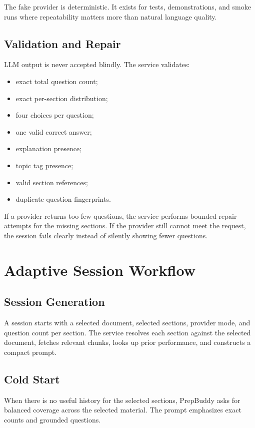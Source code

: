 \documentclass[11pt]{article}
\begin{document}
The fake provider is deterministic. It exists for tests, demonstrations, and smoke runs where repeatability matters more than natural language quality.

\subsection{Validation and Repair}

LLM output is never accepted blindly. The service validates:

\begin{itemize}
  \item exact total question count;
  \item exact per-section distribution;
  \item four choices per question;
  \item one valid correct answer;
  \item explanation presence;
  \item topic tag presence;
  \item valid section references;
  \item duplicate question fingerprints.
\end{itemize}

If a provider returns too few questions, the service performs bounded repair attempts for the missing sections. If the provider still cannot meet the request, the session fails clearly instead of silently showing fewer questions.

\section{Adaptive Session Workflow}

\subsection{Session Generation}

A session starts with a selected document, selected sections, provider mode, and question count per section. The service resolves each section against the selected document, fetches relevant chunks, looks up prior performance, and constructs a compact prompt.

\subsection{Cold Start}

When there is no useful history for the selected sections, PrepBuddy asks for balanced coverage across the selected material. The prompt emphasizes exact counts and grounded questions.
\end{document}
